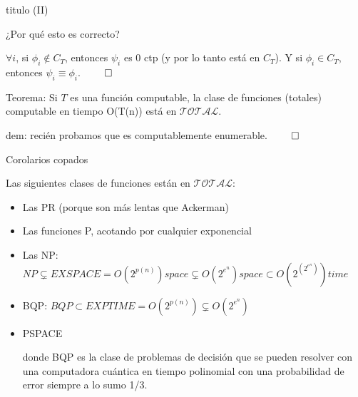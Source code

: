 \documentclass[10pt]{beamer}
\begin{document}
\begin{frame}{titulo (II)}

¿Por qué esto es correcto?
	
$\forall i$, si $\phi_i \not \in C_T$, entonces $\psi_i$ es 0 ctp (y por lo tanto está en $C_T$). Y si $\phi_i \in C_T$, entonces $\psi_i \equiv \phi_i$. $\qed$


\end{frame}

\begin{frame}
	Teorema: Si $T$ es una función computable, la clase de funciones (totales) computable en tiempo O(T(n)) está en $\mathcal{TOTAL}$.
	
	dem: recién probamos que es computablemente enumerable. $\qed$
\end{frame}


\begin{frame}{Corolarios copados}

Las siguientes clases de funciones están en $\mathcal{TOTAL}$:

\begin{itemize}
	\item Las PR (porque son más lentas que Ackerman)
	\item Las funciones P, acotando por cualquier exponencial
	\item Las NP: $NP \subsetneq EXSPACE = O(2^{p(n)}) space \subsetneq O(2^{e^n}) space \subset O(2^{(2^{e^n})}) time$



	\item BQP: $BQP \subset EXPTIME = O(2^{p(n)}) \subsetneq O(2^{e^n})$
	\item PSPACE
	
	donde BQP es la clase de problemas de decisión que se pueden resolver con una computadora cuántica en tiempo polinomial con una probabilidad de error siempre a lo sumo 1/3.
\end{itemize}

\end{frame}
\end{document}
